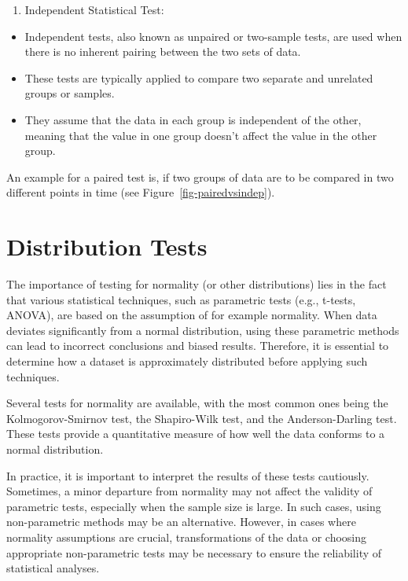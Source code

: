 \documentclass[
  a4paper,
]{scrbook}
\providecommand{\tightlist}{%
  \setlength{\itemsep}{0pt}\setlength{\parskip}{0pt}}\usepackage{longtable,booktabs,array}
\begin{document}
\begin{enumerate}
\def\labelenumi{\arabic{enumi}.}
\setcounter{enumi}{1}
\tightlist
\item
  Independent Statistical Test:
\end{enumerate}

\begin{itemize}
\tightlist
\item
  Independent tests, also known as unpaired or two-sample tests, are
  used when there is no inherent pairing between the two sets of data.
\item
  These tests are typically applied to compare two separate and
  unrelated groups or samples.
\item
  They assume that the data in each group is independent of the other,
  meaning that the value in one group doesn't affect the value in the
  other group.
\end{itemize}

An example for a paired test is, if two groups of data are to be
compared in two different points in time (see
Figure~\ref{fig-pairedvsindep}).

\newpage{}

\section{Distribution Tests}\label{distribution-tests}

The importance of testing for normality (or other distributions) lies in
the fact that various statistical techniques, such as parametric tests
(e.g., t-tests, ANOVA), are based on the assumption of for example
normality. When data deviates significantly from a normal distribution,
using these parametric methods can lead to incorrect conclusions and
biased results. Therefore, it is essential to determine how a dataset is
approximately distributed before applying such techniques.

Several tests for normality are available, with the most common ones
being the Kolmogorov-Smirnov test, the Shapiro-Wilk test, and the
Anderson-Darling test. These tests provide a quantitative measure of how
well the data conforms to a normal distribution.

In practice, it is important to interpret the results of these tests
cautiously. Sometimes, a minor departure from normality may not affect
the validity of parametric tests, especially when the sample size is
large. In such cases, using non-parametric methods may be an
alternative. However, in cases where normality assumptions are crucial,
transformations of the data or choosing appropriate non-parametric tests
may be necessary to ensure the reliability of statistical analyses.
\end{document}

